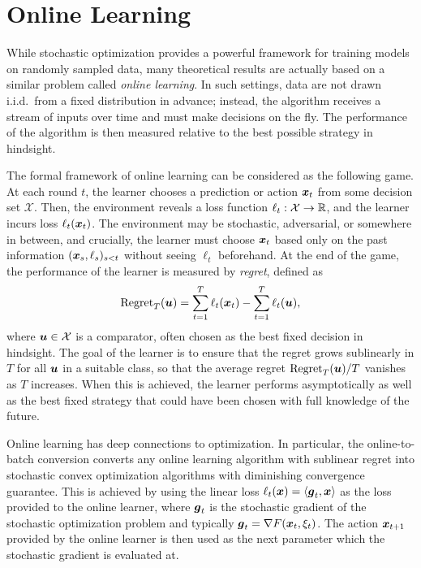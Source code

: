 \section{Online Learning}
\label{sec:ch1:online}

While stochastic optimization provides a powerful framework for training models on randomly sampled data, many theoretical results are actually based on a similar problem called \emph{online learning}. In such settings, data are not drawn i.i.d.\ from a fixed distribution in advance; instead, the algorithm receives a stream of inputs over time and must make decisions on the fly. The performance of the algorithm is then measured relative to the best possible strategy in hindsight.

The formal framework of online learning can be considered as the following game. At each round $t$, the learner chooses a prediction or action ${\boldsymbol{x}}_t$ from some decision set $\mathcal{X}$. Then, the environment reveals a loss function $\ell_t : \mathcal{X} \to \mathbb R$, and the learner incurs loss $\ell_t({\boldsymbol{x}}_t)$. The environment may be stochastic, adversarial, or somewhere in between, and crucially, the learner must choose ${\boldsymbol{x}}_t$ based only on the past information $({\boldsymbol{x}}_s, \ell_s)_{s < t}$ without seeing $\ell_t$ beforehand. At the end of the game, the performance of the learner is measured by \emph{regret}, defined as
\begin{equation}
    \mathrm{Regret}_T({\boldsymbol{u}})
    = \sum_{t=1}^T \ell_t({\boldsymbol{x}}_t) - \sum_{t=1}^T \ell_t({\boldsymbol{u}}),
    \label{eqn:ch1:regret-def}
\end{equation}
where ${\boldsymbol{u}} \in \mathcal{X}$ is a comparator, often chosen as the best fixed decision in hindsight. The goal of the learner is to ensure that the regret grows sublinearly in $T$ for all ${\boldsymbol{u}}$ in a suitable class, so that the average regret $\mathrm{Regret}_T({\boldsymbol{u}}) / T$ vanishes as $T$ increases. When this is achieved, the learner performs asymptotically as well as the best fixed strategy that could have been chosen with full knowledge of the future.

Online learning has deep connections to optimization. In particular, the online-to-batch conversion \citep{cesa2004generalization} converts any online learning algorithm with sublinear regret into stochastic convex optimization algorithms with diminishing convergence guarantee. This is achieved by using the linear loss $\ell_t({\boldsymbol{x}}) = \langle {\boldsymbol{g}}_t, {\boldsymbol{x}}\rangle$ as the loss provided to the online learner, where ${\boldsymbol{g}}_t$ is the stochastic gradient of the stochastic optimization problem and typically ${\boldsymbol{g}}_t = \nabla F({\boldsymbol{x}}_t, \xi_t)$. The action ${\boldsymbol{x}}_{t+1}$ provided by the online learner is then used as the next parameter which the stochastic gradient is evaluated at. 

